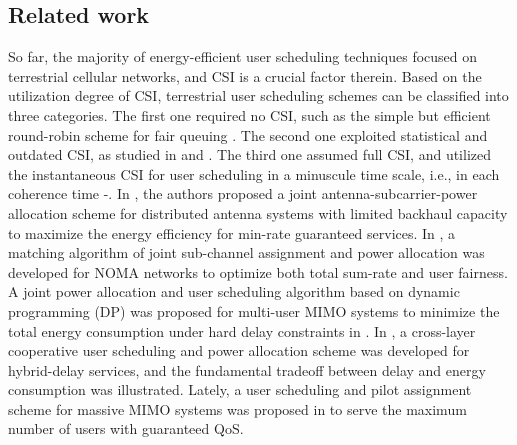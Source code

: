 \documentclass[conference]{IEEEtran}
\begin{document}
\subsection{Related work}

So far, the majority of energy-efficient user scheduling techniques focused on terrestrial cellular networks, and CSI is a crucial factor therein.  
Based on the utilization degree of CSI, terrestrial user scheduling schemes can be classified into three categories. The first one required no CSI, such as the simple but efficient round-robin scheme for fair queuing \cite{p51}. The second one exploited statistical and outdated CSI, as studied in \cite{p52} and \cite{p53}. The third one assumed full CSI, and utilized the instantaneous CSI for user scheduling in a minuscule time scale, i.e., in each coherence time \cite{p3}-\cite{p7}. 
In \cite{p3}, the authors proposed a joint antenna-subcarrier-power allocation scheme for distributed antenna systems with limited backhaul capacity to maximize the energy efficiency for min-rate guaranteed services. In \cite{p6}, a matching algorithm of joint sub-channel assignment and power allocation was developed for NOMA networks to optimize both total sum-rate and user fairness. A joint power allocation and user scheduling algorithm based on dynamic programming (DP) was proposed for multi-user MIMO systems to minimize the total energy consumption under hard delay constraints in \cite{p4}. In \cite{p5}, a cross-layer cooperative user scheduling and power allocation scheme was developed for hybrid-delay services, and the fundamental tradeoff between delay and energy consumption was illustrated. Lately, a user scheduling and pilot assignment scheme for massive MIMO systems was proposed in \cite{p7} to serve the maximum number of users with guaranteed QoS.
\end{document}
